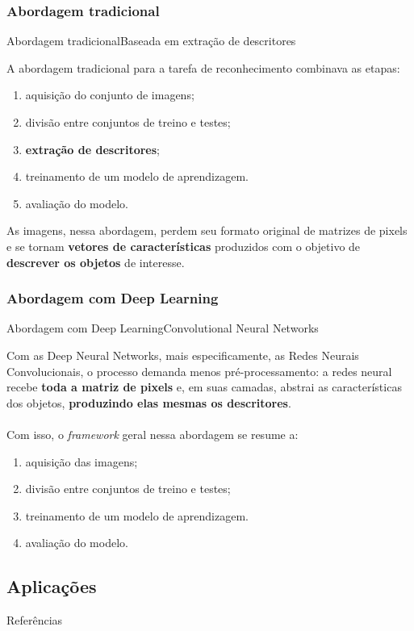 \documentclass{beamer}
\begin{document}
    \subsubsection{Abordagem tradicional}
    \begin{frame}{Abordagem tradicional}{Baseada em extração de descritores}

        A abordagem tradicional para a tarefa de reconhecimento 
        combinava as etapas:
            \begin{enumerate}
                \item aquisição do conjunto de imagens;
                \item divisão entre conjuntos de treino e testes;
                \item \textbf{extração de descritores};
                \item treinamento de um modelo de aprendizagem.
                \item avaliação do modelo.
            \end{enumerate}

        As imagens, nessa abordagem, perdem seu
        formato original de matrizes de pixels
        e se tornam \textbf{vetores de características}
        produzidos com o objetivo de \textbf{descrever
        os objetos} de interesse.
    \end{frame}

    \subsubsection{Abordagem com Deep Learning}
    \begin{frame}{Abordagem com Deep Learning}{Convolutional Neural Networks}
        
        Com as Deep Neural Networks, mais especificamente,
        as Redes Neurais Convolucionais, o processo demanda menos
        pré-processamento: a redes neural
        recebe \textbf{toda a matriz de pixels}
        e, em suas camadas, abstrai as características
        dos objetos, \textbf{produzindo elas mesmas os descritores}.
        \\~\\
        Com isso, o \emph{framework} geral nessa abordagem 
        se resume a:
        \begin{enumerate}
            \item aquisição das imagens;
            \item divisão entre conjuntos de treino e testes;
            \item treinamento de um modelo de aprendizagem.
            \item avaliação do modelo.
        \end{enumerate}
   
    \end{frame}

    \subsection{Aplicações}
    

    \begin{frame}{Referências}
        
        
    \end{frame}
\end{document}
